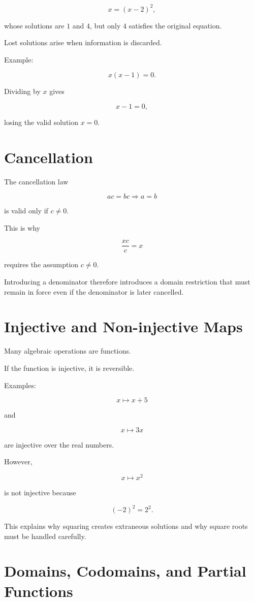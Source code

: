 \documentclass{essay}
\begin{document}
\[ x=(x-2)^{2}, \]

whose solutions are \(1\) and \(4\), but only \(4\) satisfies the original equation.

Lost solutions arise when information is discarded.

Example:

\[ x(x-1)=0. \]

Dividing by \(x\) gives

\[ x-1=0, \]

losing the valid solution \(x=0\).

\section{Cancellation}

The cancellation law

\[ ac=bc\Longrightarrow a=b \]

is valid only if \(c\neq0\).

This is why

\[ \frac{xc}{c}=x \]

requires the assumption \(c\neq0\).

Introducing a denominator therefore introduces a domain restriction that must
remain in force even if the denominator is later cancelled.

\section{Injective and Non-injective Maps}

Many algebraic operations are functions.

If the function is injective, it is reversible.

Examples:

\[ x\mapsto x+5 \]

and

\[ x\mapsto 3x \]

are injective over the real numbers.

However,

\[ x\mapsto x^{2} \]

is not injective because

\[ (-2)^{2}=2^{2}. \]

This explains why squaring creates extraneous solutions and why square roots
must be handled carefully.

\section{Domains, Codomains, and Partial Functions}
\end{document}

